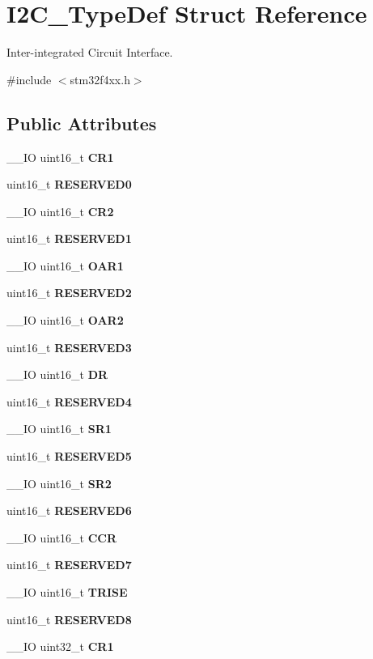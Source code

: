 \section{I2\+C\+\_\+\+Type\+Def Struct Reference}
\label{structI2C__TypeDef}


Inter-\/integrated Circuit Interface.  




{\ttfamily \#include $<$stm32f4xx.\+h$>$}

\subsection*{Public Attributes}
\begin{DoxyCompactItemize}
\item 
\+\_\+\+\_\+\+IO uint16\+\_\+t \textbf{ C\+R1}
\item 
uint16\+\_\+t \textbf{ R\+E\+S\+E\+R\+V\+E\+D0}
\item 
\+\_\+\+\_\+\+IO uint16\+\_\+t \textbf{ C\+R2}
\item 
uint16\+\_\+t \textbf{ R\+E\+S\+E\+R\+V\+E\+D1}
\item 
\+\_\+\+\_\+\+IO uint16\+\_\+t \textbf{ O\+A\+R1}
\item 
uint16\+\_\+t \textbf{ R\+E\+S\+E\+R\+V\+E\+D2}
\item 
\+\_\+\+\_\+\+IO uint16\+\_\+t \textbf{ O\+A\+R2}
\item 
uint16\+\_\+t \textbf{ R\+E\+S\+E\+R\+V\+E\+D3}
\item 
\+\_\+\+\_\+\+IO uint16\+\_\+t \textbf{ DR}
\item 
uint16\+\_\+t \textbf{ R\+E\+S\+E\+R\+V\+E\+D4}
\item 
\+\_\+\+\_\+\+IO uint16\+\_\+t \textbf{ S\+R1}
\item 
uint16\+\_\+t \textbf{ R\+E\+S\+E\+R\+V\+E\+D5}
\item 
\+\_\+\+\_\+\+IO uint16\+\_\+t \textbf{ S\+R2}
\item 
uint16\+\_\+t \textbf{ R\+E\+S\+E\+R\+V\+E\+D6}
\item 
\+\_\+\+\_\+\+IO uint16\+\_\+t \textbf{ C\+CR}
\item 
uint16\+\_\+t \textbf{ R\+E\+S\+E\+R\+V\+E\+D7}
\item 
\+\_\+\+\_\+\+IO uint16\+\_\+t \textbf{ T\+R\+I\+SE}
\item 
uint16\+\_\+t \textbf{ R\+E\+S\+E\+R\+V\+E\+D8}
\item 
\+\_\+\+\_\+\+IO uint32\+\_\+t \textbf{ C\+R1}

\end{DoxyCompactItemize}
